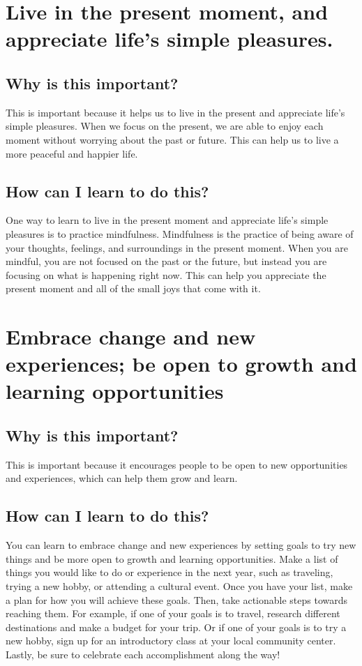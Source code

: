 \documentclass[11pt]{article}
\begin{document}
\section{Live in the present moment, and appreciate life’s simple pleasures.}
\label{sec:org68e778e}
\subsection{Why is this important?}
\label{sec:org3ed3236}
This is important because it helps us to live in the present and appreciate life's simple pleasures. When we focus on the present, we are able to enjoy each moment without worrying about the past or future. This can help us to live a more peaceful and happier life.

\subsection{How can I learn to do this?}
\label{sec:orgcb9daf2}
One way to learn to live in the present moment and appreciate life's simple pleasures is to practice mindfulness. Mindfulness is the practice of being aware of your thoughts, feelings, and surroundings in the present moment. When you are mindful, you are not focused on the past or the future, but instead you are focusing on what is happening right now. This can help you appreciate the present moment and all of the small joys that come with it.

\section{Embrace change and new experiences; be open to growth and learning opportunities}
\label{sec:org6af5691}
\subsection{Why is this important?}
\label{sec:orgd570ae8}
This is important because it encourages people to be open to new opportunities and experiences, which can help them grow and learn.

\subsection{How can I learn to do this?}
\label{sec:org720489e}
You can learn to embrace change and new experiences by setting goals to try new things and be more open to growth and learning opportunities. Make a list of things you would like to do or experience in the next year, such as traveling, trying a new hobby, or attending a cultural event. Once you have your list, make a plan for how you will achieve these goals. Then, take actionable steps towards reaching them. For example, if one of your goals is to travel, research different destinations and make a budget for your trip. Or if one of your goals is to try a new hobby, sign up for an introductory class at your local community center. Lastly, be sure to celebrate each accomplishment along the way!
\end{document}
